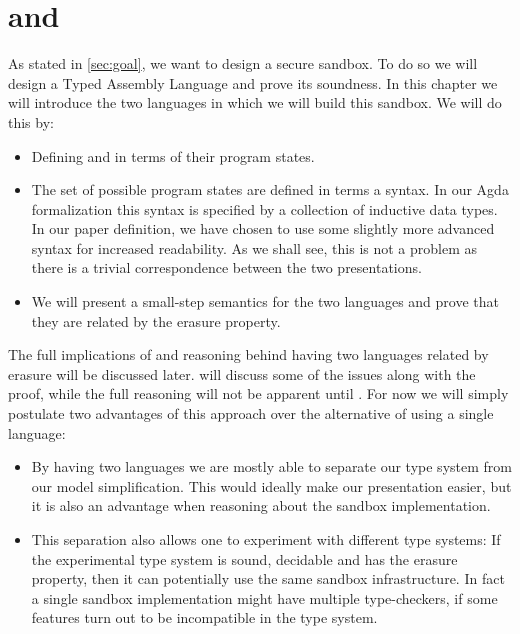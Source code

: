 \chapter{\ATAL and \ATALe}
\label{chap:lang}

As stated in \cref{sec:goal}, we want to design a secure sandbox. To do so we
will design a Typed Assembly Language and prove its soundness. In this chapter
we will introduce the two languages in which we will build this sandbox. We will
do this by:

\begin{itemize}
\item Defining \ATAL and \ATALe in terms of their program states.
\item The set of possible program states are defined in terms a syntax. In our
  Agda formalization this syntax is specified by a collection of inductive data
  types. In our paper definition, we have chosen to use some slightly more
  advanced syntax for increased readability. As we shall see, this is not a
  problem as there is a trivial correspondence between the two presentations.
\item We will present a small-step semantics for the two languages and prove
  that they are related by the erasure property.
\end{itemize}

The full implications of and reasoning behind having two languages related by
erasure will be discussed later.  will discuss some of the
issues along with the proof, while the full reasoning will not be apparent until
. For now we will simply postulate two advantages of this
approach over the alternative of using a single language:

\begin{itemize}
\item By having two languages we are mostly able to separate our type system
  from our model simplification. This would ideally make our presentation
  easier, but it is also an advantage when reasoning about the sandbox
  implementation.
\item This separation also allows one to experiment with different type systems:
  If the experimental type system is sound, decidable and has the erasure
  property, then it can potentially use the same sandbox infrastructure. In fact
  a single sandbox implementation might have multiple type-checkers, if some
  features turn out to be incompatible in the type system.
\end{itemize}

